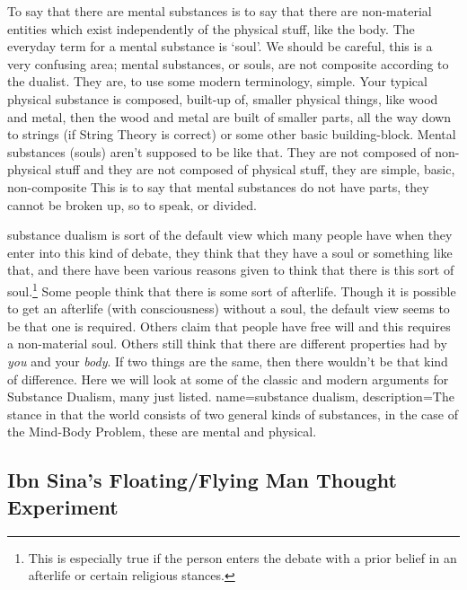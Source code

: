 To say that there are mental substances is to say that there are non-material entities which exist independently of the physical stuff, like the body. The everyday term for a mental substance is `soul'. We should be careful, this is a very confusing area; mental substances, or souls, are not composite according to the dualist. They are, to use some modern terminology, simple. Your typical physical substance is composed, built-up of, smaller physical things, like wood and metal, then the wood and metal are built of smaller parts, all the way down to strings (if String Theory is correct) or some other basic building-block. Mental substances (souls) aren't supposed to be like that. They are not composed of non-physical stuff and they are not composed of physical stuff, they are simple, basic, non-composite This is to say that mental substances do not have parts, they cannot be broken up, so to speak, or divided. 

\Gls{substance dualism} is sort of the default view which many people have when they enter into this kind of debate, they think that they have a soul or something like that, and there have been various reasons given to think that there is this sort of soul.\footnote{This is especially true if the person enters the debate with a prior belief in an afterlife or certain religious stances.} Some people think that there is some sort of afterlife. Though it is possible to get an afterlife (with consciousness) without a soul, the default view seems to be that one is required. Others claim that people have free will and this requires a non-material soul. Others still think that there are different properties had by \emph{you} and your \emph{body}. If two things are the same, then there wouldn't be that kind of difference. Here we will look at some of the classic and modern arguments for Substance Dualism, many just listed.
{
name=substance dualism,
description={The stance in that the world consists of two general kinds of substances, in the case of the Mind-Body Problem, these are mental and physical.}
}
\subsection{Ibn Sina's Floating/Flying Man Thought Experiment}

